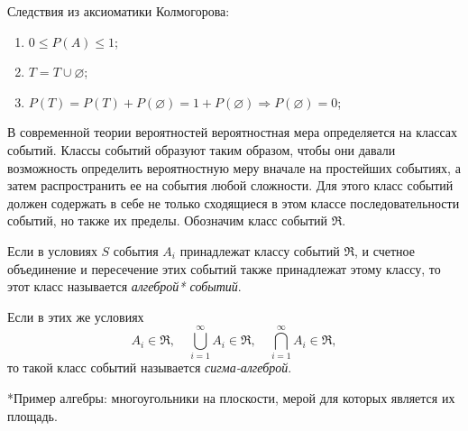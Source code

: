 \documentclass[polytech/stats/exam-2023/stats-exam-2023.tex]{subfiles}
\begin{document}
    Следствия из аксиоматики Колмогорова:
    \begin{enumerate}
        \item $0 \leq P(A) \leq 1$;
        \item $T = T \cup \varnothing$;
        \item $P(T) = P(T) + P(\varnothing) = 1 + P(\varnothing) \Rightarrow P(\varnothing) = 0$;
    \end{enumerate}

    В современной теории вероятностей вероятностная мера определяется на классах событий. Классы событий образуют таким образом,
    чтобы они давали возможность определить вероятностную меру вначале на простейших событиях, а затем распространить ее на события
    любой сложности. Для этого класс событий должен содержать в себе не только сходящиеся в этом классе последовательности событий,
    но также их пределы. Обозначим класс событий $\mathfrak{R}$. 
    
    \begin{definition}
        Если в условиях $S$ события $A_i$ принадлежат классу событий $\mathfrak{R}$, и счетное объединение и пересечение этих событий также
        принадлежат этому классу, то этот класс называется \textit{алгеброй* событий}.
        \vspace{0.5cm}
        
        Если в этих же условиях
        \begin{equation*}
            A_i \in \mathfrak{R}, \quad \bigcup_{i=1}^{\infty} A_i \in \mathfrak{R}, \quad \bigcap_{i=1}^{\infty} A_i \in \mathfrak{R},
        \end{equation*}
        то такой класс событий называется \textit{сигма-алгеброй}.
        \vspace{0.5cm}
        
        *Пример алгебры: многоугольники на плоскости, мерой для которых является их площадь.
    \end{definition}
\end{document}

